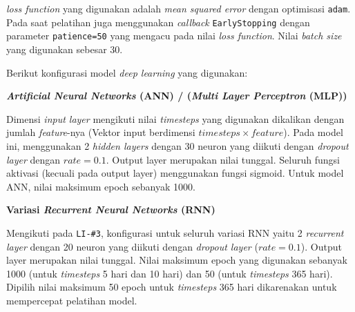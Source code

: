 \documentclass[11pt]{article}
\begin{document}
\emph{loss function} yang digunakan adalah \emph{mean squared error}
dengan optimisasi \texttt{adam}. Pada saat pelatihan juga menggunakan
\emph{callback} \texttt{EarlyStopping} dengan parameter
\texttt{patience=50} yang mengacu pada nilai \emph{loss function}. Nilai
\emph{batch size} yang digunakan sebesar 30.

Berikut konfigurasi model \emph{deep learning} yang digunakan:

\textbf{\emph{Artificial Neural Networks} (ANN) / (\emph{Multi Layer
Perceptron} (MLP))}

Dimensi \emph{input layer} mengikuti nilai \emph{timesteps} yang
digunakan dikalikan dengan jumlah \emph{feature}-nya (Vektor input
berdimensi \(timesteps \times feature\)). Pada model ini, menggunakan 2
\emph{hidden layers} dengan \(30\) neuron yang diikuti dengan
\emph{dropout layer} dengan \(rate=0.1\). Output layer merupakan nilai
tunggal. Seluruh fungsi aktivasi (kecuali pada output layer) menggunakan
fungsi sigmoid. Untuk model ANN, nilai maksimum epoch sebanyak 1000.

\textbf{Variasi \emph{Recurrent Neural Networks} (RNN)}

Mengikuti pada \texttt{LI-\#3}, konfigurasi untuk seluruh variasi RNN
yaitu 2 \emph{recurrent layer} dengan 20 neuron yang diikuti dengan
\emph{dropout layer} (\(rate=0.1\)). Output layer merupakan nilai
tunggal. Nilai maksimum epoch yang digunakan sebanyak 1000 (untuk
\emph{timesteps} 5 hari dan 10 hari) dan 50 (untuk \emph{timesteps} 365
hari). Dipilih nilai maksimum 50 epoch untuk \emph{timesteps} 365 hari
dikarenakan untuk mempercepat pelatihan model.
\end{document}
